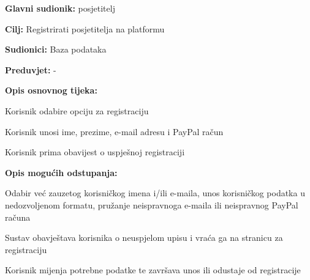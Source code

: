 					\noindent {}
					\begin{packed_item}
	
						\item \textbf{Glavni sudionik: } posjetitelj
						\item  \textbf{Cilj:}  Registrirati posjetitelja na platformu
						\item  \textbf{Sudionici:}  Baza podataka
						\item  \textbf{Preduvjet:}  -
						\item  \textbf{Opis osnovnog tijeka:}
						
						\item[] \begin{packed_enum}
	
							\item  Korisnik odabire opciju za registraciju
							\item  Korisnik unosi ime, prezime, e-mail adresu i PayPal račun
							\item  Korisnik prima obavijest o uspješnoj registraciji
						\end{packed_enum}
						
						\item  \textbf{Opis mogućih odstupanja:}
						
						\item[] \begin{packed_item}
	
							\item[2.a]  Odabir već zauzetog korisničkog imena i/ili e-maila, unos korisničkog 
							podatka u nedozvoljenom formatu, pružanje neispravnoga e-maila ili neispravnog PayPal računa
							\item[] \begin{packed_enum}
								
								\item  Sustav obavještava korisnika o neuspjelom upisu i 
								vraća ga na stranicu za registraciju
								\item  Korisnik mijenja potrebne podatke te završava unos ili
								odustaje od registracije
								
							\end{packed_enum}
							
						\end{packed_item}
					\end{packed_item}
						
